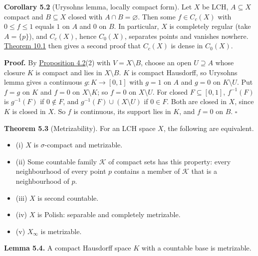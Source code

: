 \documentclass[
  english,
  11pt,
  a4paper,
]{article}
\providecommand{\tightlist}{%
  \setlength{\itemsep}{0pt}\setlength{\parskip}{0pt}}
\begin{document}
\textbf{Corollary 5.2} (Urysohn\textquotesingle s lemma, locally compact
form). Let \(X\) be LCH, \(A\subseteq X\) compact and \(B\subseteq X\)
closed with \(A\cap B=\varnothing\). Then some \(f\in C_c(X)\) with
\(0\leq f\leq1\) equals \(1\) on \(A\) and \(0\) on \(B\). In
particular, \(X\) is completely regular (take \(A=\{p\}\)), and
\(C_c(X)\), hence \(C_0(X)\), separates points and vanishes nowhere.
\hyperlink{the-stone-weierstrass-theorem-for-functions-vanishing-at-infinity--oa-fnd-sw-09}{Theorem
10.1} then gives a second proof that \(C_c(X)\) is dense in \(C_0(X)\).

\textbf{Proof.} By
\hyperlink{the-stone-weierstrass-theorem-for-functions-vanishing-at-infinity--oa-fnd-sw-15}{Proposition
4.2}(2) with \(V=X\setminus B\), choose an open \(U\supseteq A\) whose
closure \(K\) is compact and lies in \(X\setminus B\). \(K\) is compact
Hausdorff, so Urysohn\textquotesingle s lemma gives a continuous
\(g:K\to[0,1]\) with \(g=1\) on \(A\) and \(g=0\) on \(K\setminus U\).
Put \(f=g\) on \(K\) and \(f=0\) on \(X\setminus K\); so \(f=0\) on
\(X\setminus U\). For closed \(F\subseteq[0,1]\), \(f^{-1}(F)\) is
\(g^{-1}(F)\) if \(0\notin F\), and \(g^{-1}(F)\cup(X\setminus U)\) if
\(0\in F\). Both are closed in \(X\), since \(K\) is closed in \(X\). So
\(f\) is continuous, its support lies in \(K\), and \(f=0\) on \(B\).
\(\square\)

\textbf{Theorem 5.3} (Metrizability). For an LCH space \(X\), the
following are equivalent.

\begin{itemize}
\tightlist
\item
  (i) \(X\) is \(\sigma\)-compact and metrizable.
\item
  (ii) Some countable family \(\mathcal K\) of compact sets has this
  property: every neighbourhood of every point \(p\) contains a member
  of \(\mathcal K\) that is a neighbourhood of \(p\).
\item
  (iii) \(X\) is second countable.
\item
  (iv) \(X\) is Polish: separable and completely metrizable.
\item
  (v) \(X_\infty\) is metrizable.
\end{itemize}

\textbf{Lemma 5.4.} A compact Hausdorff space \(K\) with a countable
base is metrizable.
\end{document}
